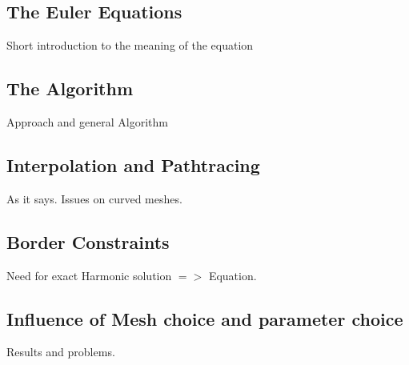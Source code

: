 \documentclass[]{scrbook}
\begin{document}
	\subsection{The Euler Equations}
	Short introduction to the meaning of the equation
	\subsection{The Algorithm}
	Approach and general Algorithm
	\subsection{Interpolation and Pathtracing}
	As it says. Issues on curved meshes.
	\subsection{Border Constraints}
	Need for exact Harmonic solution $=>$ Equation.
	\subsection{Influence of Mesh choice and parameter choice}
	Results and problems.
	
	
	
\end{document}
